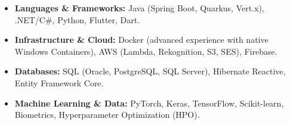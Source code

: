 \begin{itemize}[leftmargin=*, noitemsep]
    \item \textbf{Languages \& Frameworks:} Java (Spring Boot, Quarkus, Vert.x), .NET/C\#, Python, Flutter, Dart. %
    \item \textbf{Infrastructure \& Cloud:} Docker (advanced experience with native Windows Containers), AWS (Lambda, Rekognition, S3, SES), Firebase. %
    \item \textbf{Databases:} SQL (Oracle, PostgreSQL, SQL Server), Hibernate Reactive, Entity Framework Core. %
    \item \textbf{Machine Learning \& Data:} PyTorch, Keras, TensorFlow, Scikit-learn, Biometrics, Hyperparameter Optimization (HPO). %
\end{itemize}
